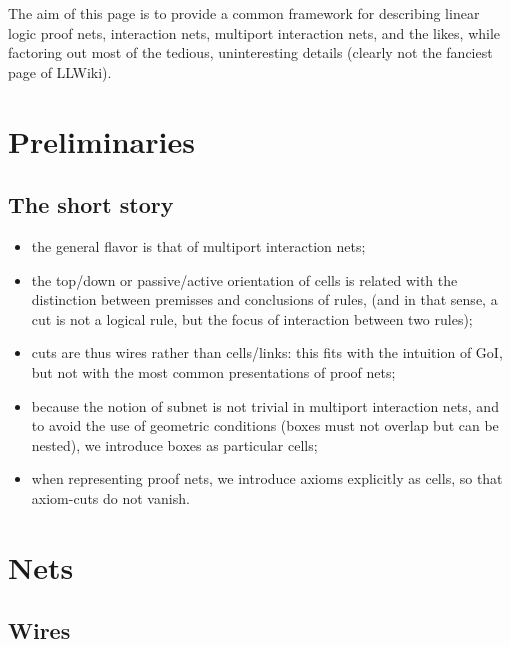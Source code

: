 
The aim of this page is to provide a common framework for describing
linear logic proof nets, interaction nets, multiport interaction nets,
and the likes, while factoring out most of the tedious, uninteresting
details (clearly not the fanciest page of LLWiki).

\section{Preliminaries}\label{preliminaries}

\subsection{The short story}\label{the-short-story}

\begin{itemize}
\tightlist
\item
  the general flavor is that of multiport interaction nets;
\item
  the top/down or passive/active orientation of cells is related with
  the distinction between premisses and conclusions of rules, (and in
  that sense, a cut is not a logical rule, but the focus of interaction
  between two rules);
\item
  cuts are thus wires rather than cells/links: this fits with the
  intuition of GoI, but not with the most common presentations of proof
  nets;
\item
  because the notion of subnet is not trivial in multiport interaction
  nets, and to avoid the use of geometric conditions (boxes must not
  overlap but can be nested), we introduce boxes as particular cells;
\item
  when representing proof nets, we introduce axioms explicitly as cells,
  so that axiom-cuts do not vanish.
\end{itemize}

\section{Nets}\label{nets}

\subsection{Wires}\label{wires}

